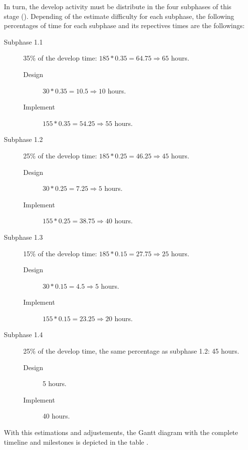 \documentclass[twocolumn, 9pt]{extarticle}
\begin{document}
In turn, the develop activity must be distribute in the four subphases
of this stage (). Depending of the estimate
difficulty for each subphase, the following percentages of time for
each subphase and its repectives times are the followings:

\begin{description}
\item[Subphase 1.1] 35\% of the develop time: $185 * 0.35 = 64.75
  \Rightarrow 65$ hours.
  \begin{description}
    \item[Design] $30 * 0.35 = 10.5 \Rightarrow 10$ hours.
    \item[Implement] $155 * 0.35 = 54.25 \Rightarrow 55$ hours.
  \end{description}
\item[Subphase 1.2] 25\% of the develop time: $185 * 0.25 = 46.25
  \Rightarrow 45$ hours.
  \begin{description}
    \item[Design] $30 * 0.25 = 7.25 \Rightarrow 5$ hours.
    \item[Implement] $155 * 0.25 = 38.75 \Rightarrow 40$ hours.
  \end{description}
\item[Subphase 1.3] 15\% of the develop time: $185 * 0.15 = 27.75
  \Rightarrow 25$ hours.
  \begin{description}
  \item[Design] $30 * 0.15 = 4.5 \Rightarrow 5$ hours.
  \item[Implement] $155 * 0.15 = 23.25 \Rightarrow 20$ hours.
  \end{description}
\item[Subphase 1.4] 25\% of the develop time, the same percentage as
  subphase 1.2: 45 hours.
  \begin{description}
    \item[Design] 5 hours.
    \item[Implement] 40 hours.
  \end{description}
\end{description}

With this estimations and adjustements, the Gantt diagram with the
complete timeline and milestones is depicted in the table
.
\end{document}
